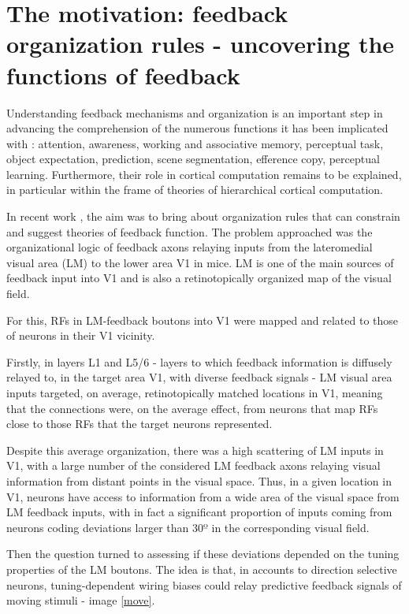 \section{The motivation: feedback organization rules - uncovering the functions of feedback}
\label{subsec:subcsectionE}

 Understanding feedback mechanisms and organization is an important step in advancing the comprehension of the numerous functions it has been implicated with \cite{TopDown}: attention, awareness, working and associative memory, perceptual task, object expectation, prediction, scene segmentation, efference copy, perceptual learning.
Furthermore, their role in cortical computation remains to be explained, in particular within the frame of theories of hierarchical cortical computation.

In recent work \cite{Marques2018}, the aim was to bring about organization rules that can constrain and suggest theories of feedback function. 
The problem approached was the organizational logic of feedback axons relaying inputs from the lateromedial visual area (LM) to the lower area V1 in mice. LM is one of the main sources of feedback input into V1 and is also a retinotopically organized map of the visual field.

For this, RFs in LM-feedback boutons into V1 were mapped and related to those of neurons in their V1 vicinity.

Firstly, in layers L1 and L5/6 - layers to which feedback information is diffusely relayed to, in the target area V1, with diverse feedback signals \cite{9Marques2018kk} - LM visual area inputs targeted, on average, retinotopically matched locations in V1, meaning that the connections were, on the average effect, from neurons that map RFs close to those RFs that the target neurons represented. 

Despite this average organization, there was a high scattering of LM inputs in V1, with a large number of the considered LM feedback axons relaying visual information from distant points in the visual space. Thus, in a given location in V1, neurons have access to information from a wide area of the visual space from LM feedback inputs, with in fact a significant proportion of inputs coming from neurons coding deviations larger than $30º$ in the corresponding visual field.

Then the question turned to assessing if these deviations depended on the tuning properties of the LM boutons. The idea is that, in accounts to direction selective neurons, tuning-dependent wiring biases could relay predictive feedback signals of moving stimuli - image \ref{move}.

